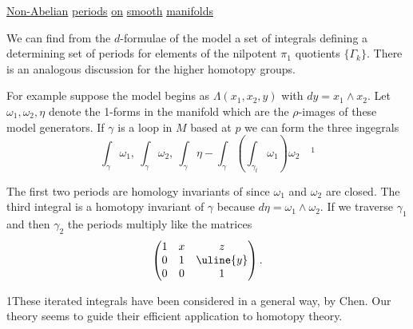 \uline{Non-Abelian} \uline{periods} \uline{on} \uline{smooth} \uline{manifolds}

We can find from the $d$-formulae of the model a set
of integrals defining a determining set of periods for
elements of the nilpotent $\pi_1$ quotients $\{\Gamma_k\}$. There is an
analogous discussion for the higher homotopy groups.

For example suppose the model begins as $\Lambda(x_1,x_2,y)$
with $dy=x_1\wedge x_2$. Let $\omega_1,\omega_2,\eta$ denote the 1-forms in
the manifold which are the $\rho$-images of these model generators.
If $\gamma$ is a loop in $M$ based at $p$ we can form the three
ingegrals
\[
\int_\gamma\omega_1,\ \int_\gamma\omega_2,\
\int_\gamma\eta-\int_\gamma\left(\int_{\gamma_t}\omega_1\right)\omega_2
\quad{}^1
\]

The first two periods are homology invariants of
since $\omega_1$ and $\omega_2$ are closed. The third integral is a
homotopy invariant of $\gamma$ because $d\eta=\omega_1\wedge\omega_2$. If we
traverse $\gamma_1$ and then $\gamma_2$ the periods multiply like the
matrices
\[
\begin{pmatrix}1&x&z\\0&1&\uline{y}\\0&0&1\end{pmatrix}.
\]


1\quad These iterated integrals have been considered in
a general way, by Chen. Our theory seems to guide
their efficient application to homotopy theory.

